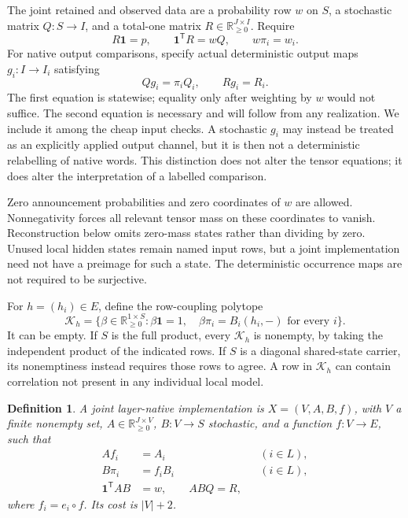 \documentclass[11pt]{article}
\newcommand{\R}{\mathbb R}
\newcommand{\one}{\mathbf 1}
\newcommand{\Kcal}{\mathcal K}
\newtheorem{definition}[theorem]{Definition}
\theoremstyle{remark}
\begin{document}
The joint retained and observed data are a probability row $w$ on $S$, a stochastic matrix $Q:S\to I$, and a total-one matrix $R\in\R_{\ge0}^{J\times I}$. Require
\begin{equation}\label{eq:data-consistency}
 R\one=p,\qquad \one^{\mathsf T}R=wQ,\qquad w\pi_i=w_i.
\end{equation}
For native output comparisons, specify actual deterministic output maps $g_i:I\to I_i$ satisfying
\begin{equation}\label{eq:output-square}
 Qg_i=\pi_iQ_i,\qquad Rg_i=R_i.
\end{equation}
The first equation is statewise; equality only after weighting by $w$ would not suffice. The second equation is necessary and will follow from any realization. We include it among the cheap input checks. A stochastic $g_i$ may instead be treated as an explicitly applied output channel, but it is then not a deterministic relabelling of native words. This distinction does not alter the tensor equations; it does alter the interpretation of a labelled comparison.

Zero announcement probabilities and zero coordinates of $w$ are allowed. Nonnegativity forces all relevant tensor mass on these coordinates to vanish. Reconstruction below omits zero-mass states rather than dividing by zero. Unused local hidden states remain named input rows, but a joint implementation need not have a preimage for such a state. The deterministic occurrence maps are not required to be surjective.

For $h=(h_i)\in E$, define the row-coupling polytope
\begin{equation}\label{eq:Kh}
 \Kcal_h=\{\beta\in\R_{\ge0}^{1\times S}:
 \beta\one=1,\quad \beta\pi_i=B_i(h_i,-)\text{ for every }i\}.
\end{equation}
It can be empty. If $S$ is the full product, every $\Kcal_h$ is nonempty, by taking the independent product of the indicated rows. If $S$ is a diagonal shared-state carrier, its nonemptiness instead requires those rows to agree. A row in $\Kcal_h$ can contain correlation not present in any individual local model.

\begin{definition}\label{def:implementation}
A \emph{joint layer-native implementation} is $X=(V,A,B,f)$, with $V$ a finite nonempty set, $A\in\R_{\ge0}^{J\times V}$, $B:V\to S$ stochastic, and a function $f:V\to E$, such that
\begin{align}
 A f_i&=A_i &&(i\in L),\label{eq:root-preservation}\\
 B\pi_i&=f_iB_i &&(i\in L),\label{eq:row-preservation}\\
 \one^{\mathsf T}AB&=w,\qquad ABQ=R,\label{eq:global-laws}
\end{align}
where $f_i=e_i\circ f$. Its cost is $|V|+2$.
\end{definition}
\end{document}

